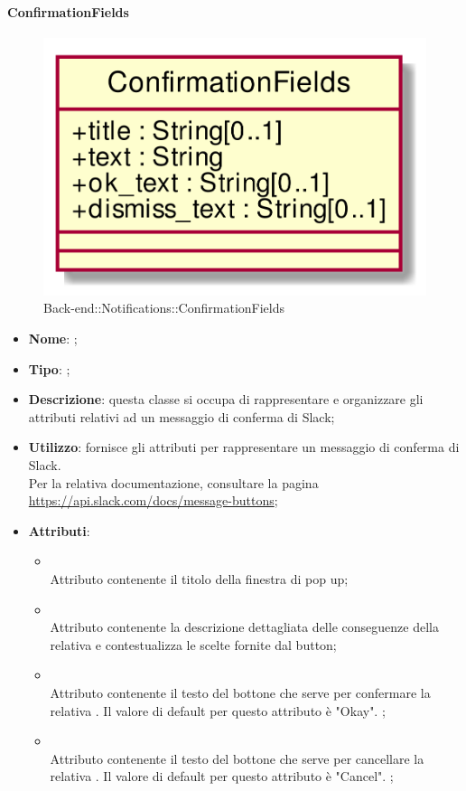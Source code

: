 \hypertarget{ConfirmationFields_label}{\paragraph{ConfirmationFields}}
\begin{figure}[h]
	\centering
	\includegraphics[width=\textwidth,height=\textheight,keepaspectratio]{images/ClassConfirmationFields.png}
	\caption{Back-end::Notifications::ConfirmationFields}
\end{figure}
\begin{itemize}
	\item \textbf{Nome}: ;
	\item \textbf{Tipo}: ;
	\item \textbf{Descrizione}: questa classe si occupa di rappresentare e organizzare gli attributi relativi ad un messaggio di conferma di Slack;
	\item \textbf{Utilizzo}: fornisce gli attributi per rappresentare un messaggio di conferma di Slack.
\\
Per la relativa documentazione, consultare la pagina \url{https://api.slack.com/docs/message-buttons};
	\item \textbf{Attributi}:
	\begin{itemize}
		\item[]  \\
		Attributo contenente il titolo della finestra di pop up;
		\item[]  \\
		Attributo contenente la descrizione dettagliata delle conseguenze della relativa  e contestualizza le scelte fornite dal button;
		\item[]  \\
		Attributo contenente il testo del bottone che serve per confermare la relativa . Il valore di default per questo attributo è "Okay".
;
		\item[]  \\
		Attributo contenente il testo del bottone che serve per cancellare la relativa . Il valore di default per questo attributo è "Cancel". ;
	\end{itemize}
\end{itemize}
\FloatBarrier

